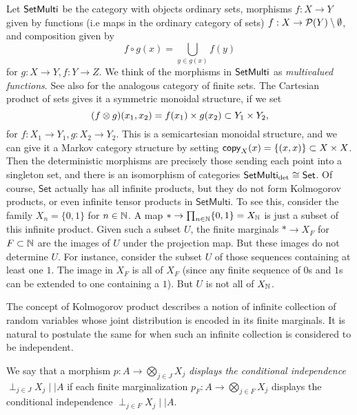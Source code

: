 \documentclass[11pt]{article}
\renewcommand{\sf}{\mathsf}
\begin{document}
\begin{example}
    \label{setmulti}
    Let $\operatorname{\mathsf{SetMulti}}$ be the category with objects ordinary sets, morphisms $f: X \to Y$ given by functions (i.e maps in the ordinary category of sets) $f: X \to \mathcal{P}(Y)\setminus \emptyset$, and composition given by
    \[f\circ g(x) = \bigcup_{y \in g(x)} f(y)\]
    for $g: X \to Y, f: Y \to Z$.
    We think of the morphisms in $\operatorname{\mathsf{SetMulti}}$ as \emph{multivalued functions}.
    See also \cite[Example~2.6]{markov_cats} for the analogous category of finite sets.
    The Cartesian product of sets gives it a symmetric monoidal structure, if we set \[(f \otimes g)(x_1,x_2) = f(x_1) \times g(x_2) \subset Y_1 \times Y_2,\] for $f:X_1 \to Y_1, g: X_2 \to Y_2$.
    This is a semicartesian monoidal structure, and we can give it a Markov category structure by setting
    $\mathsf{copy}_{X}(x) = \{(x,x)\} \subset X \times X$.
    Then the deterministic morphisms are precisely those sending each point into a singleton set, and there is an isomorphism of categories
    $\SetMulti_\detc \cong \sf{Set}$.
    Of course, $\sf{Set}$ actually has all infinite products, but they do not form Kolmogorov products, or even infinite tensor products in $\sf{SetMulti}$.
    To see this, consider the family $X_n = \{0,1\}$ for $n \in \mathbb{N}$.
    A map $* \to \prod_{n\in \mathbb{N}} \{0,1\} = X_{\mathbb{N}}$ is just a subset of this infinite product.
    Given such a subset $U$, the finite marginals $* \to X_F$ for $F \subset \mathbb{N}$ are the images of $U$ under the projection map.
    But these images do not determine $U$. For instance, consider the subset $U$ of those sequences containing at least one $1$.
    The image in $X_F$ is all of $X_F$ (since any finite sequence of $0$s and $1$s can be extended to one containing a $1$).
    But $U$ is not all of $X_{\mathbb{N}}$.

\end{example}

The concept of Kolmogorov product describes a notion of infinite collection of random variables whose joint distribution is encoded in its finite marginals. It is natural to postulate the same for when such an infinite collection is considered to be independent.

\begin{definition}
	We say that a morphism $p : A \to \bigotimes_{j \in J} X_j$ \emph{displays the conditional independence} $\perp_{j \in J}  X_j \mid\mid A$ if each finite marginalization $p_F : A \to \bigotimes_{j \in F} X_j$ displays the conditional independence $\perp_{j \in F} X_j \mid\mid A$.
\end{definition}
\end{document}

